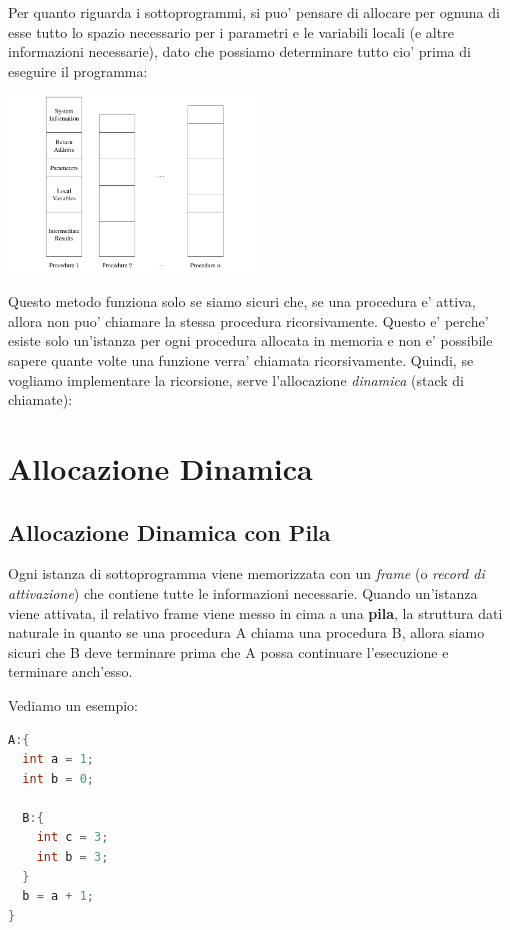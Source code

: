 Per quanto riguarda i sottoprogrammi, si puo' pensare di allocare per ognuna di esse tutto lo spazio necessario per i parametri e le variabili locali (e altre informazioni necessarie), dato che possiamo determinare tutto cio' prima di eseguire il programma:
\begin{center}
  \includegraphics[width=0.5\textwidth]{img/2025-03-02-10-46-16.png}
\end{center}

Questo metodo funziona solo se siamo sicuri che, se una procedura e' attiva, allora non puo' chiamare la stessa procedura ricorsivamente. Questo e' perche' esiste solo un'istanza per ogni procedura allocata in memoria e non e' possibile sapere quante volte una funzione verra' chiamata ricorsivamente. Quindi, se vogliamo implementare la ricorsione, serve l'allocazione \textit{dinamica} (stack di chiamate):

\section{Allocazione Dinamica}
\subsection{Allocazione Dinamica con Pila}

Ogni istanza di sottoprogramma viene memorizzata con un \textit{frame} (o \textit{record di attivazione}) che contiene tutte le informazioni necessarie. Quando un'istanza viene attivata, il relativo frame viene messo in cima a una \textbf{pila}, la struttura dati naturale in quanto se una procedura A chiama una procedura B, allora siamo sicuri che B deve terminare prima che A possa continuare l'esecuzione e terminare anch'esso.


Vediamo un esempio:

\begin{lstlisting}[language=C]
A:{
  int a = 1;
  int b = 0;

  B:{
    int c = 3;
    int b = 3;
  }
  b = a + 1;
}
\end{lstlisting}

